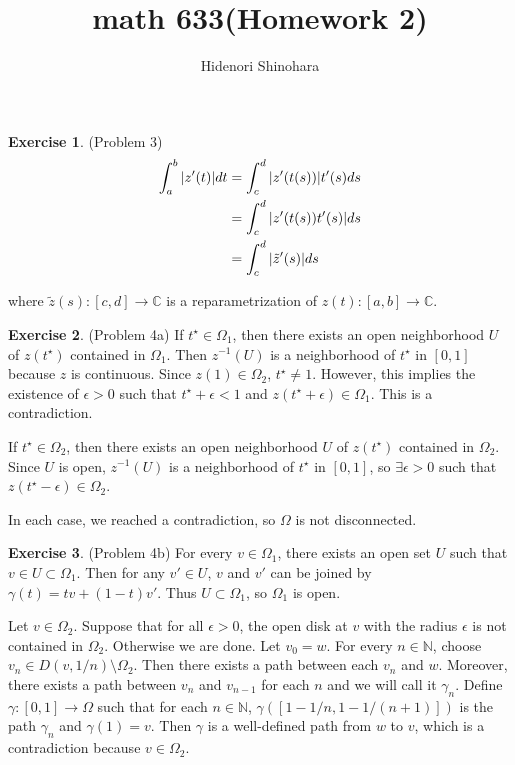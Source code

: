 \documentclass[12pt, psamsfonts]{amsart}
\theoremstyle{definition}
\newtheorem*{exer}{Exercise}
\theoremstyle{remark}
\numberwithin{equation}{section}
\begin{document}
\title{math 633(Homework 2)}
\author{Hidenori Shinohara}
\maketitle

\begin{exer}{(Problem 3)}
  \begin{align*}
    \int_a^b \abs{z'(t)} dt
      &= \int_c^d \abs{z'(t(s))}t'(s) ds \\
      &= \int_c^d \abs{z'(t(s))t'(s)} ds \\
      &= \int_c^d \abs{\tilde{z}'(s)} ds
  \end{align*}
  
  where $\tilde{z}(s): [c, d] \rightarrow \mathbb{C}$ is a reparametrization of $z(t): [a, b] \rightarrow \mathbb{C}$.
\end{exer}

\begin{exer}{(Problem 4a)}
  If $t^{\star} \in \Omega_1$, then there exists an open neighborhood $U$ of $z(t^{\star})$ contained in $\Omega_1$.
  Then $z^{-1}(U)$ is a neighborhood of $t^{\star}$ in $[0, 1]$ because $z$ is continuous.
  Since $z(1) \in \Omega_2$, $t^{\star} \ne 1$.
  However, this implies the existence of $\epsilon > 0$ such that $t^{\star} + \epsilon < 1$ and $z(t^{\star} + \epsilon) \in \Omega_1$.
  This is a contradiction.

  If $t^{\star} \in \Omega_2$, then there exists an open neighborhood $U$ of $z(t^{\star})$ contained in $\Omega_2$.
  Since $U$ is open, $z^{-1}(U)$ is a neighborhood of $t^{\star}$ in $[0, 1]$, so $\exists \epsilon > 0$ such that $z(t^{\star} - \epsilon) \in \Omega_2$.

  In each case, we reached a contradiction, so $\Omega$ is not disconnected.
\end{exer}

\begin{exer}{(Problem 4b)}
  For every $v \in \Omega_1$, there exists an open set $U$ such that $v \in U \subset \Omega_1$.
  Then for any $v' \in U$, $v$ and $v'$ can be joined by $\gamma(t) = tv + (1 - t)v'$.
  Thus $U \subset \Omega_1$, so $\Omega_1$ is open.

  Let $v \in \Omega_2$.
  Suppose that for all $\epsilon > 0$, the open disk at $v$ with the radius $\epsilon$ is not contained in $\Omega_2$.
  Otherwise we are done.
  Let $v_0 = w$.
  For every $n \in \mathbb{N}$, choose $v_n \in D(v, 1/n) \setminus \Omega_2$.
  Then there exists a path between each $v_n$ and $w$.
  Moreover, there exists a path between $v_n$ and $v_{n - 1}$ for each $n$ and we will call it $\gamma_n$.
  Define $\gamma: [0, 1] \rightarrow \Omega$ such that for each $n \in \mathbb{N}$, $\gamma([1 - 1/n, 1 - 1/(n+1)])$ is the path $\gamma_n$ and $\gamma(1) = v$.
  Then $\gamma$ is a well-defined path from $w$ to $v$, which is a contradiction because $v \in \Omega_2$.
\end{exer}
\end{document}

